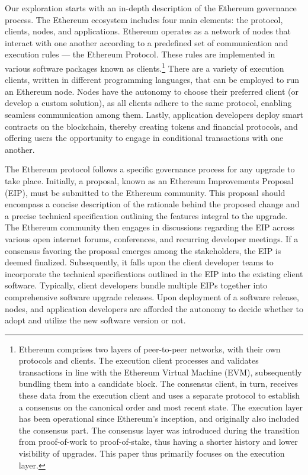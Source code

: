 \documentclass[No]{AEA}
\begin{document}
Our exploration starts with an in-depth description of the Ethereum governance process. The Ethereum ecosystem includes four main elements: the protocol, clients, nodes, and applications. Ethereum operates as a network of nodes that interact with one another according to a predefined set of communication and execution rules — the Ethereum Protocol. These rules are implemented in various software packages known as clients.\footnote{Ethereum comprises two layers of peer-to-peer networks, with their own protocols and clients. The execution client processes and validates transactions in line with the Ethereum Virtual Machine (EVM), subsequently bundling them into a candidate block. The consensus client, in turn, receives these data from the execution client and uses a separate protocol to establish a consensus on the canonical order and most recent state.  The execution layer has been operational since Ethereum's inception, and originally also included the consensus part. The consensus layer was introduced during the transition from proof-of-work to proof-of-stake, thus having a shorter history and lower visibility of upgrades. This paper thus primarily focuses on the execution layer.} There are a variety of execution clients, written in different programming languages, that can be employed to run an Ethereum node. Nodes have the autonomy to choose their preferred client (or develop a custom solution), as all clients adhere to the same protocol, enabling seamless communication among them. Lastly, application developers deploy smart contracts on the blockchain, thereby creating tokens and financial protocols, and offering users the opportunity to engage in conditional transactions with one another.

The Ethereum protocol follows a specific governance process for any upgrade to take place. Initially, a proposal, known as an Ethereum Improvements Proposal (EIP), must be submitted to the Ethereum community. This proposal should encompass a concise description of the rationale behind the proposed change and a precise technical specification outlining the features integral to the upgrade. The Ethereum community then engages in discussions regarding the EIP across various open internet forums, conferences, and recurring developer meetings. If a consensus favoring the proposal emerges among the stakeholders, the EIP is deemed finalized. Subsequently, it falls upon the client developer teams to incorporate the technical specifications outlined in the EIP into the existing client software. Typically, client developers bundle multiple EIPs together into comprehensive software upgrade releases. Upon deployment of a software release, nodes, and application developers are afforded the autonomy to decide whether to adopt and utilize the new software version or not. 
\end{document}

